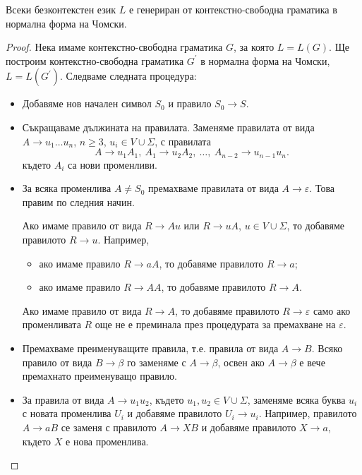 \begin{thm}
  Всеки безконтекстен език $L$ е генериран от контекстно-свободна
  граматика в нормална форма на Чомски.
\end{thm}
\begin{proof}
  Нека имаме контекстно-свободна граматика $G$, за която $L = L(G)$.
  Ще построим контекстно-свободна граматика $G^\prime$ в нормална форма на Чомски, $L = L(G^\prime)$.
  Следваме следната процедура:
  \begin{itemize}
  \item
    Добавяме нов начален символ $S_0$ и правило $S_0 \to S$.
  \item
    Съкращаваме дължината на правилата.
    Заменяме правилата от вида $A\to u_1\dots u_n$, $n\geq 3$, $u_i \in V\cup\Sigma$, с
    правилата \[A\to u_1A_1,\ A_1\to u_2A_2,\ \dots,\ A_{n-2} \to u_{n-1}u_n.\]
    където $A_i$ са нови променливи.
  \item
    За всяка променлива $A \neq S_0$ премахваме правилата от вида $A\to\varepsilon$.
    Това правим по следния начин.
    
    Ако имаме правило от вида $R \to Au$ или $R\to u A$, $u \in V \cup \Sigma$,
    то добавяме правилото $R\to u$.
    Например, 
    \begin{itemize}
    \item 
      ако имаме правило $R\to aA$, то добавяме правилото $R \to a$;
    \item
      ако имаме правило $R\to AA$, то добавяме правилото $R \to A$.
    \end{itemize}
    Ако имаме правило от вида $R\to A$, то добавяме правилото $R\to\varepsilon$
    само ако променливата $R$ още не е преминала през процедурата за премахване на $\varepsilon$.
  \item
    Премахваме преименуващите правила, т.е. правила от вида $A\to B$.
    Всяко правило от вида $B \to \beta$ го заменяме с $A\to \beta$,
    освен ако $A \to \beta$ е вече премахнато преименуващо правило.
  \item
    За правила от вида $A\to u_1 u_2$, където $u_1, u_2 \in V \cup \Sigma$, 
    заменяме всяка буква $u_i$ с новата променлива $U_i$
    и добавяме правилото $U_i\to u_i$.
    Например, правилото $A \to aB$ се заменя с правилото $A \to XB$ и добавяме правилото $X \to a$,
    където $X$ е нова променлива.
  \end{itemize}
\end{proof}

